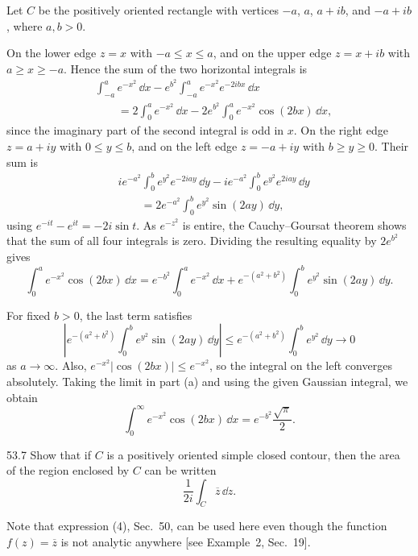 \documentclass[11pt,oneside]{article}
\begin{document}
\begin{solution}
Let $C$ be the positively oriented rectangle with vertices $-a$, $a$, $a+ib$, and $-a+ib$, where $a, b>0$.
\begin{exercisesubparts}
\item On the lower edge $z=x$ with $-a\le x\le a$, and on the upper edge $z=x+ib$ with $a\ge x\ge-a$. Hence the sum of the two horizontal integrals is
\begin{align*}
    &\int_{-a}^{a}e^{-x^2}\,\dd x
       -e^{b^2}\int_{-a}^{a}e^{-x^2}e^{-2ibx}\,\dd x\\
    &\qquad=2\int_0^a e^{-x^2}\,\dd x
       -2e^{b^2}\int_0^a e^{-x^2}\cos(2bx)\,\dd x,
\end{align*}
since the imaginary part of the second integral is odd in $x$.
On the right edge $z=a+iy$ with $0\le y\le b$, and on the left edge $z=-a+iy$ with $b\ge y\ge0$. Their sum is
\begin{align*}
    &ie^{-a^2}\int_0^b e^{y^2}e^{-2iay}\,\dd y
     -ie^{-a^2}\int_0^b e^{y^2}e^{2iay}\,\dd y\\
    &\qquad=2e^{-a^2}\int_0^b e^{y^2}\sin(2ay)\,\dd y,
\end{align*}
using $e^{-it}-e^{it}=-2i\sin t$. As $e^{-z^2}$ is entire, the Cauchy--Goursat theorem shows that the sum of all four integrals is zero. Dividing the resulting equality by $2e^{b^2}$ gives
\[
    \boxed{\int_0^a e^{-x^2}\cos(2bx)\,\dd x
    =e^{-b^2}\int_0^a e^{-x^2}\,\dd x
    +e^{-(a^2+b^2)}\int_0^b e^{y^2}\sin(2ay)\,\dd y.}
\]
\item For fixed $b>0$, the last term satisfies
\[
    \left|e^{-(a^2+b^2)}\int_0^b e^{y^2}\sin(2ay)\,\dd y\right|
    \le e^{-(a^2+b^2)}\int_0^b e^{y^2}\,\dd y\longrightarrow0
\]
as $a\to\infty$. Also, $e^{-x^2}|\cos(2bx)|\le e^{-x^2}$, so the integral on the left converges absolutely. Taking the limit in part (a) and using the given Gaussian integral, we obtain
\[
    \boxed{\int_0^\infty e^{-x^2}\cos(2bx)\,\dd x
     =e^{-b^2}\frac{\sqrt\pi}{2}.}
\]
\end{exercisesubparts}
\end{solution}

\begin{exercise}{53.7}
Show that if $C$ is a positively oriented simple closed contour, then the area of the region enclosed by $C$ can be written
\[
    \frac1{2i}\int_C\overline z\,\dd z.
\]
\begin{suggestion}
Note that expression (4), Sec.~50, can be used here even though the function $f(z)=\overline z$ is not analytic anywhere [see Example~2, Sec.~19].
\end{suggestion}
\end{exercise}
\end{document}
